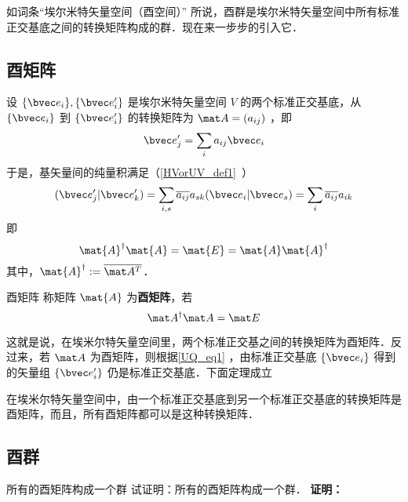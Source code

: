 
如词条“埃尔米特矢量空间（酉空间）” 所说，酉群是埃尔米特矢量空间中所有标准正交基底之间的转换矩阵构成的群．现在来一步步的引入它．
\subsection{酉矩阵}
设 $\{\bvec e_i\},\{\bvec e'_i\}$ 是埃尔米特矢量空间 $V$ 的两个标准正交基底，从 $\{\bvec e_i\}$ 到 $\{\bvec e'_i\}$ 的转换矩阵为 $\mat A=(a_{ij})$ ，即
\begin{equation}\label{UQ_eq1}
\bvec e'_j=\sum_{i}a_{ij}\bvec e_i
\end{equation}
于是，基矢量间的纯量积满足（\autoref{HVorUV_def1}~）
\begin{equation}
(\bvec e'_j|\bvec e'_k)=\sum_{i,s}\overline{a_{ij}}a_{sk}(\bvec e_i|\bvec e_s)=\sum_{i}\overline{a_{ij}}a_{ik}
\end{equation}
即
\begin{equation}\label{UQ_eq2}
\mat{A}^\dagger \mat{A}=\mat{E}=\mat{A} \mat{A}^\dagger
\end{equation}
其中，$\mat{A}^\dagger:=\overline{\mat A^T}$．
\begin{definition}{酉矩阵}
称矩阵 $\mat{A}$ 为\textbf{酉矩阵}，若
\begin{equation}
\mat A^\dagger \mat A=\mat E
\end{equation}
\end{definition}
这就是说，在埃米尔特矢量空间里，两个标准正交基之间的转换矩阵为酉矩阵．反过来，若 $\mat A$ 为酉矩阵，则根据\autoref{UQ_eq1} ，由标准正交基底 $\{\bvec e_i\}$ 得到的矢量组 $\{\bvec e'_i\}$ 仍是标准正交基底．下面定理成立
\begin{theorem}{}
在埃米尔特矢量空间中，由一个标准正交基底到另一个标准正交基底的转换矩阵是酉矩阵，而且，所有酉矩阵都可以是这种转换矩阵．
\end{theorem}
\subsection{酉群}
\begin{example}{所有的酉矩阵构成一个群}
试证明：所有的酉矩阵构成一个群．
\textbf{证明：}
\end{example}